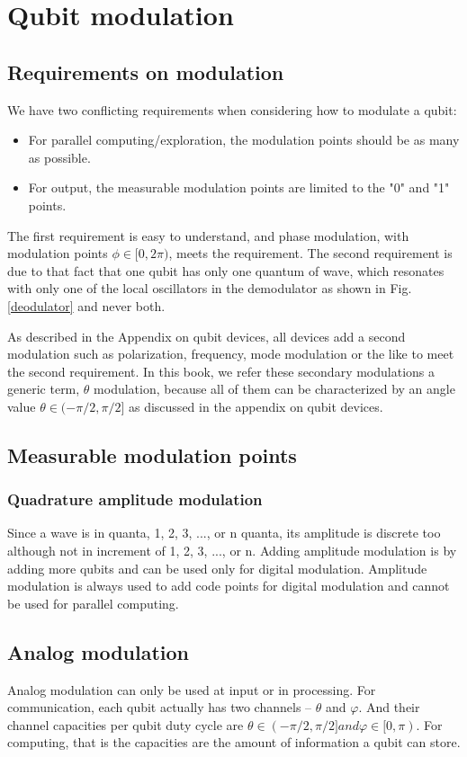 \documentclass[Letter,11pt]{book}
\begin{document}
\section{Qubit modulation}
\subsection{Requirements on modulation}
We have two conflicting requirements when considering how to modulate a qubit:
\begin{itemize}
    \item For parallel computing/exploration, the modulation points should be as many as possible.
    \item For output, the measurable modulation points are limited to the "0" and "1" points.
\end{itemize}

The first requirement is easy to understand, and phase modulation, with modulation points $\phi \in [0, 2\pi)$, meets the requirement. The second requirement is due to that fact that one qubit has only one quantum of wave, which resonates with only one of the local oscillators in the demodulator as shown in Fig. \ref{deodulator} and never both.

As described in the Appendix on qubit devices, all devices add a second modulation such as polarization, frequency, mode modulation or the like to meet the second requirement. In this book, we refer these secondary modulations a generic term, $\theta$ modulation, because all of them can be characterized by an angle value $\theta \in (-\pi/2, \pi/2]$ as discussed in the appendix on qubit devices.

\subsection{Measurable modulation points}
\subsubsection{Quadrature amplitude modulation}
Since a wave is in quanta, 1, 2, 3, ..., or n quanta, its amplitude is discrete too although not in increment of 1, 2, 3, ..., or n. Adding amplitude modulation is by adding more qubits and can be used only for digital modulation. Amplitude modulation is always used to add code points for digital modulation and cannot be used for parallel computing.

\subsection{Analog modulation}
Analog modulation can only be used at input or in processing. For communication, each qubit actually has two channels -- $\theta$ and $\varphi$. And their channel capacities per qubit duty cycle are $\theta \in (-\pi/2, \pi/2] and \varphi \in [0, \pi)$. For computing, that is the capacities are the amount of information a qubit can store.
\end{document}
